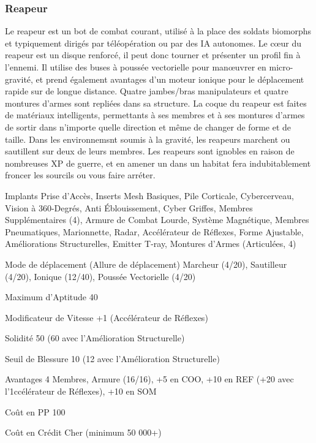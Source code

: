 \subsubsection{Reapeur} \label{sec:starting-reaper} 

Le reapeur est un bot de combat courant, utilisé à la place des soldats biomorphs et typiquement dirigés par téléopération ou par des IA autonomes. Le cœur du reapeur est un disque renforcé, il peut donc tourner et présenter un profil fin à l'ennemi. Il utilise des buses à poussée vectorielle pour manœuvrer en micro-gravité, et prend également avantages d'un moteur ionique pour le déplacement rapide sur de longue distance. Quatre jambes/bras manipulateurs et quatre montures d'armes sont repliées dans sa structure. La coque du reapeur est faites de matériaux intelligents, permettants à ses membres et à ses montures d'armes de sortir dans n'importe quelle direction et même de changer de forme et de taille. Dans les environnemsnt soumis à la gravité, les reapeurs marchent ou sautillent sur deux de leurs membres. Les reapeurs sont ignobles en raison de nombreuses XP de guerre, et en amener un dans un habitat fera indubitablement froncer les sourcils ou vous faire arréter. 

\begin{description*} \item[Implants] Prise d'Accès, Inserts Mesh Basiques, Pile Corticale, Cybercerveau, Vision à 360-Degrés, Anti Éblouissement, Cyber Griffes, Membres Supplémentaires (4), Armure de Combat Lourde, Système Magnétique, Membres Pneumatiques, Marionnette, Radar, Accélérateur de Réflexes, Forme Ajustable, Améliorations Structurelles, Emitter T-ray, Montures d'Armes (Articulées, 4) \item[Mode de déplacement](Allure de déplacement) Marcheur (4/20), Sautilleur (4/20), Ionique (12/40), Poussée Vectorielle (4/20)\item[Maximum d'Aptitude] 40 \item[Modificateur de Vitesse] +1 (Accélérateur de Réflexes) \item [Solidité] 50 (60 avec l'Amélioration Structurelle) \item[Seuil de Blessure] 10 (12 avec l'Amélioration Structurelle) \item[Avantages] 4 Membres, Armure (16/16), +5 en COO, +10 en REF (+20 avec l'1ccélérateur de Réflexes), +10 en SOM \item[Coût en PP] 100 \item[Coût en Crédit] Cher (minimum 50 000+) \end{description*} 

